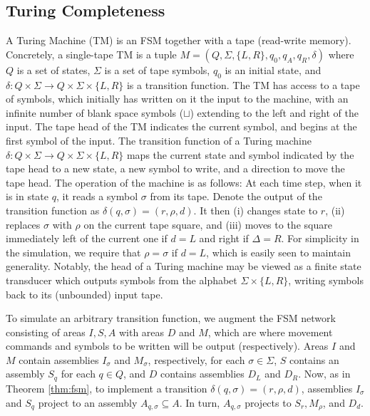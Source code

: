 \documentclass[12pt,nosubfloats]{alt2024} %
\newcommand{\1}{\mathbbm{1}}
\begin{document}
\subsection{Turing Completeness}
A Turing Machine (TM) 
is an FSM together with a tape (read-write memory). Concretely, a single-tape TM is a tuple $M = (Q, \Sigma, \{L, R\}, q_0, q_A, q_R, \delta)$ where $Q$ is a set of states, $\Sigma$ is a set of tape symbols, $q_0$ is an initial state, and $\delta \colon Q \times \Sigma \to Q \times \Sigma \times \{L, R\}$ is a transition function. The TM has access to a tape of symbols, which initially has written on it the input to the machine, with an infinite number of blank space symbols ($\sqcup$) extending to the left and right of the input. The tape head of the TM indicates the current symbol, and begins at the first symbol of the input. The transition function of a Turing machine $\delta \colon Q \times \Sigma \to Q \times \Sigma \times \{L, R\}$ maps the current state and symbol indicated by the tape head to a new state, a new symbol to write, and a direction to move the tape head. The operation of the machine is as follows: At each time step, when it is in state $q$, it reads a symbol $\sigma$ from its tape. Denote the output of the transition function as $\delta(q, \sigma) = (r, \rho, d)$. It then (i) changes state to $r$, (ii) replaces $\sigma$ with $\rho$ on the current tape square, and (iii) moves to the square immediately left of the current one if $d = L$ and right if $\Delta = R$. For simplicity in the simulation, we require that $\rho = \sigma$ if $d = L$, which is easily seen to maintain generality. 
Notably, the head of a Turing machine may be viewed as a finite state transducer which outputs symbols from the alphabet $\Sigma \times \{L, R\}$, writing symbols back to its (unbounded) input tape. 

To simulate an arbitrary transition function, we augment the FSM network consisting of areas $I, S, A$ with areas $D$ and $M$, which are where movement commands and symbols to be written will be output (respectively). Areas $I$ and $M$ contain assemblies $I_\sigma$ and $M_\sigma$, respectively, for each $\sigma \in \Sigma$, $S$ contains an assembly $S_q$ for each $q \in Q$, and $D$ contains assemblies $D_L$ and $D_R$. Now, as in Theorem \ref{thm:fsm}, to implement a transition $\delta(q, \sigma) = (r, \rho, d)$, assemblies $I_\sigma$ and $S_q$ project to an assembly $A_{q, \sigma} \subseteq A$. In turn, $A_{q, \sigma}$ projects to $S_r, M_\rho$, and $D_d$.
\end{document}
